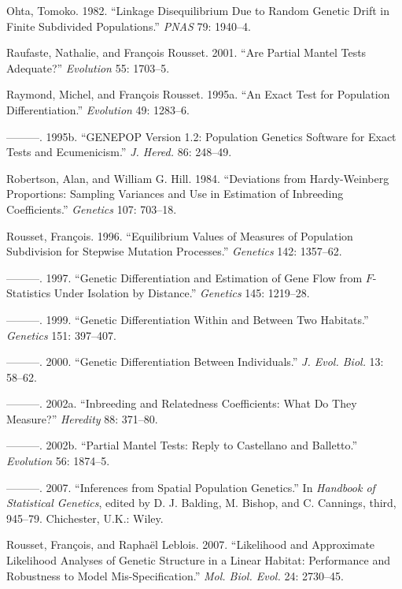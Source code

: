 \documentclass[12pt,]{book}
\begin{document}
\hypertarget{ref-Ohta82p}{}
Ohta, Tomoko. 1982. ``Linkage Disequilibrium Due to Random Genetic Drift
in Finite Subdivided Populations.'' \emph{PNAS} 79: 1940--4.

\hypertarget{ref-RaufasteR01}{}
Raufaste, Nathalie, and François Rousset. 2001. ``Are Partial Mantel
Tests Adequate?'' \emph{Evolution} 55: 1703--5.

\hypertarget{ref-RaymondR95evol}{}
Raymond, Michel, and François Rousset. 1995a. ``An Exact Test for
Population Differentiation.'' \emph{Evolution} 49: 1283--6.

\hypertarget{ref-RaymondR95}{}
---------. 1995b. ``GENEPOP Version 1.2: Population Genetics Software
for Exact Tests and Ecumenicism.'' \emph{J. Hered.} 86: 248--49.

\hypertarget{ref-RobertsonH84}{}
Robertson, Alan, and William G. Hill. 1984. ``Deviations from
Hardy-Weinberg Proportions: Sampling Variances and Use in Estimation of
Inbreeding Coefficients.'' \emph{Genetics} 107: 703--18.

\hypertarget{ref-Rousset96}{}
Rousset, François. 1996. ``Equilibrium Values of Measures of Population
Subdivision for Stepwise Mutation Processes.'' \emph{Genetics} 142:
1357--62.

\hypertarget{ref-Rousset97}{}
---------. 1997. ``Genetic Differentiation and Estimation of Gene Flow
from \(F\)-Statistics Under Isolation by Distance.'' \emph{Genetics}
145: 1219--28.

\hypertarget{ref-Rousset99g}{}
---------. 1999. ``Genetic Differentiation Within and Between Two
Habitats.'' \emph{Genetics} 151: 397--407.

\hypertarget{ref-Rousset00}{}
---------. 2000. ``Genetic Differentiation Between Individuals.''
\emph{J. Evol. Biol.} 13: 58--62.

\hypertarget{ref-Rousset02h}{}
---------. 2002a. ``Inbreeding and Relatedness Coefficients: What Do
They Measure?'' \emph{Heredity} 88: 371--80.

\hypertarget{ref-Rousset02e}{}
---------. 2002b. ``Partial Mantel Tests: Reply to Castellano and
Balletto.'' \emph{Evolution} 56: 1874--5.

\hypertarget{ref-Rousset07w}{}
---------. 2007. ``Inferences from Spatial Population Genetics.'' In
\emph{Handbook of Statistical Genetics}, edited by D. J. Balding, M.
Bishop, and C. Cannings, third, 945--79. Chichester, U.K.: Wiley.

\hypertarget{ref-RoussetL07}{}
Rousset, François, and Raphaël Leblois. 2007. ``Likelihood and
Approximate Likelihood Analyses of Genetic Structure in a Linear
Habitat: Performance and Robustness to Model Mis-Specification.''
\emph{Mol. Biol. Evol.} 24: 2730--45.
\end{document}
